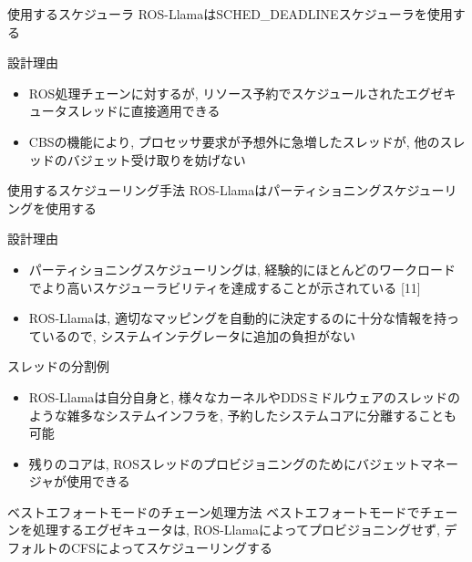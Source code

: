 \begin{frame}{使用するスケジューラ}
    ROS-LlamaはSCHED\_DEADLINEスケジューラを使用する
    \begin{block}{設計理由}
        \setlength{\linewidth}{0.98\columnwidth}
        \begin{itemize}
            \item ROS処理チェーンに対するが, リソース予約でスケジュールされたエグゼキュータスレッドに直接適用できる
            \item CBSの機能により, プロセッサ要求が予想外に急増したスレッドが, 他のスレッドのバジェット受け取りを妨げない
        \end{itemize}
    \end{block}
\end{frame}

\begin{frame}{使用するスケジューリング手法}
    ROS-Llamaはパーティショニングスケジューリングを使用する
    \begin{block}{設計理由}
        \setlength{\linewidth}{0.98\columnwidth}
        \begin{itemize}
            \item パーティショニングスケジューリングは, 経験的にほとんどのワークロードでより高いスケジューラビリティを達成することが示されている [11]
            \item ROS-Llamaは, 適切なマッピングを自動的に決定するのに十分な情報を持っているので, システムインテグレータに追加の負担がない
        \end{itemize}
    \end{block}
\end{frame}

\begin{frame}{スレッドの分割例}
    \begin{itemize}
        \item ROS-Llamaは自分自身と, 様々なカーネルやDDSミドルウェアのスレッドのような雑多なシステムインフラを, 予約したシステムコアに分離することも可能
        \item 残りのコアは, ROSスレッドのプロビジョニングのためにバジェットマネージャが使用できる
    \end{itemize}
\end{frame}

\begin{frame}{ベストエフォートモードのチェーン処理方法}
    ベストエフォートモードでチェーンを処理するエグゼキュータは, ROS-Llamaによってプロビジョニングせず, デフォルトのCFSによってスケジューリングする
\end{frame}


